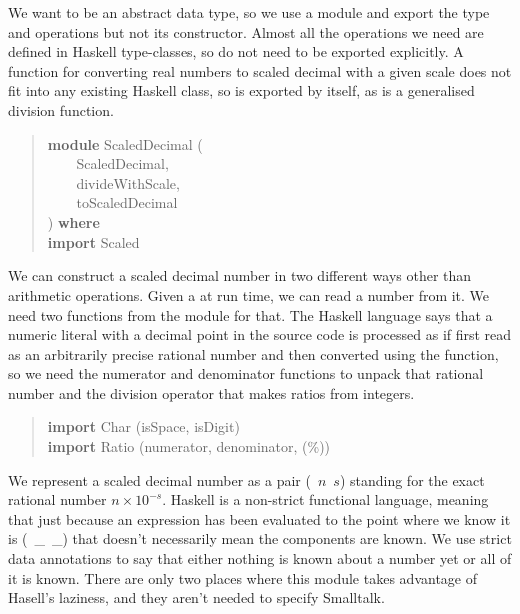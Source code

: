\documentclass[prodmode,acmtoplas]{acmsmall}
\begin{document}
We want  to be an abstract data type, so we use a
module and export the type and operations but not its constructor.
Almost all the operations we need are defined in Haskell type-classes,
so do not need to be exported explicitly.  A function for converting
real numbers to scaled decimal with a given scale does not fit into any
existing Haskell class, so is exported by itself, as is a generalised
division function.

\begin{quote}
\begin{tabbing}
\sffamily \textbf{module} ScaledDecimal (\\
\verb|    |\sffamily    ScaledDecimal,\\
\verb|    |\sffamily    divideWithScale,\\
\verb|    |\sffamily    toScaledDecimal\\
\sffamily ) \textbf{where}\\
\sffamily \textbf{import} Scaled
\end{tabbing}
\end{quote}

We can construct a scaled decimal number in two different ways
other than arithmetic operations.
Given a  at run time, we can read a number from it.
We need two functions from the  module for that.
The Haskell language says that a numeric literal with a decimal
point in the source code is processed as if first read as
an arbitrarily precise rational number and then converted using
the  function, so we need the numerator and
denominator functions to unpack that rational number and the
division operator that makes ratios from integers.

\begin{quote}
\begin{tabbing}
\sffamily \textbf{import} Char (isSpace, isDigit)\\
\sffamily \textbf{import} Ratio (numerator, denominator, (\%))
\end{tabbing}
\end{quote}

We represent a scaled decimal number as a pair
(~$n$~$s$) standing for the exact rational number
$n\times 10^{-s}$.  Haskell is a non-strict functional language,
meaning that just because an expression has been evaluated to
the point where we know it is (~\_~\_) that doesn't
necessarily mean the components are known.  We use strict data
annotations to say that either nothing is known about a number yet
or all of it is known.  There are only two places where this
module takes advantage of Hasell's laziness, and they aren't needed
to specify Smalltalk.
\end{document}
